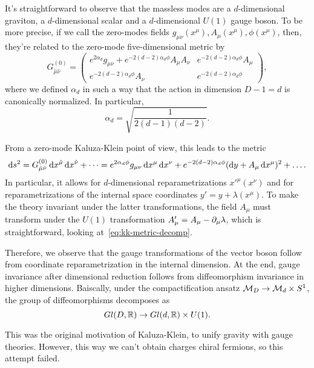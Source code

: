 It's straightforward to observe that the massless modes are a $d$-dimensional graviton, a $d$-dimensional scalar and a $d$-dimensional $U(1)$ gauge boson. To be more precise, if we call the zero-modes fields $g_{\mu\nu}(x^\mu), A_\mu(x^\mu), \phi(x^\mu)$, then, they're related to the zero-mode five-dimensional metric by
\begin{equation}
    G^{(0)}_{\hat{\mu}\hat{\nu}} = 
    \begin{pmatrix}
        e^{2\alpha_d} g_{\mu\nu} + e^{-2(d-2)\alpha_d \phi} A_\mu A_\nu & e^{-2(d-2)\alpha_d \phi} A_\mu \\
        e^{-2(d-2)\alpha_d \phi} A_\nu & e^{-2(d-2)\alpha_d \phi}
    \end{pmatrix} ,
\end{equation}
where we defined $\alpha_d$ in such a way that the action in dimension $D-1 = d$ is canonically normalized. In particular,
\begin{equation}
    \alpha_d = \sqrt{\frac{1}{2(d-1)(d-2)}} .
\end{equation}

From a zero-mode Kaluza-Klein point of view, this leads to the metric
\begin{equation}\label{eq:kk-metric-decomp}
    \mathop{}\!\mathrm{d} s^2 = G^{(0)}_{\hat{\mu}\hat{\nu}} \mathop{}\!\mathrm{d} x^{\hat{\mu}} \mathop{}\!\mathrm{d} x^{\hat{\nu}} + \dots = e^{2\alpha_d \phi} g_{\mu\nu} \mathop{}\!\mathrm{d} x^\mu \mathop{}\!\mathrm{d} x^\nu + e^{-2(d-2)\alpha_d \phi} (\mathop{}\!\mathrm{d} y + A_\mu \mathop{}\!\mathrm{d} x^\mu)^2 + \dots.
\end{equation}
In particular, it allows for $d$-dimensional reparametrizations $x'^\mu(x^\nu)$ and for reparametrizations of the internal space coordinates $y' = y + \lambda(x^\mu)$. To make the theory invariant under the latter transformations, the field $A_\mu$ must transform under the $U(1)$ transformation $A'_\mu = A_\mu - \partial_\mu \lambda$, which is straightforward, looking at~\eqref{eq:kk-metric-decomp}.

Therefore, we observe that the gauge transformations of the vector boson follow from coordinate reparametrization in the internal dimension. At the end, gauge invariance after dimensional reduction follows from diffeomorphism invariance in higher dimensions. Baiscally, under the compactification ansatz $\mathcal{M}_D \to \mathcal{M}_d \times S^1$, the group of diffeomorphisms decomposes as
\begin{equation}
    Gl(D, \mathbb{R}) \to Gl(d,\mathbb{R}) \times U(1).
\end{equation}

This was the original motivation of Kaluza-Klein, to unify gravity with gauge theories. However, this way we can't obtain charges chiral fermions, so this attempt failed.

